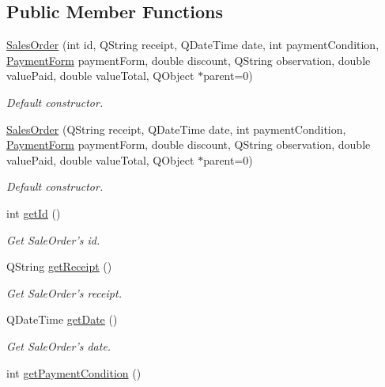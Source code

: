 \subsection*{\-Public \-Member \-Functions}
\begin{DoxyCompactItemize}
\item 
\hyperlink{class_sales_order_a1eed55622ad0394b8859cf809fbfa8ce}{\-Sales\-Order} (int id, \-Q\-String receipt, \-Q\-Date\-Time date, int payment\-Condition, \hyperlink{class_sales_order_aea62d62de9cfe64f734061c664156744}{\-Payment\-Form} payment\-Form, double discount, \-Q\-String observation, double value\-Paid, double value\-Total, \-Q\-Object $\ast$parent=0)
\begin{DoxyCompactList}\small\item\em \-Default constructor. \end{DoxyCompactList}\item 
\hyperlink{class_sales_order_aa95abd1377d1d962535eb401b94b5b08}{\-Sales\-Order} (\-Q\-String receipt, \-Q\-Date\-Time date, int payment\-Condition, \hyperlink{class_sales_order_aea62d62de9cfe64f734061c664156744}{\-Payment\-Form} payment\-Form, double discount, \-Q\-String observation, double value\-Paid, double value\-Total, \-Q\-Object $\ast$parent=0)
\begin{DoxyCompactList}\small\item\em \-Default constructor. \end{DoxyCompactList}\item 
int \hyperlink{class_sales_order_a5fed272542f7afd85f5965aadbece7af}{get\-Id} ()
\begin{DoxyCompactList}\small\item\em \-Get \-Sale\-Order's id. \end{DoxyCompactList}\item 
\-Q\-String \hyperlink{class_sales_order_ab6eb90c054023558dddb040337cf758a}{get\-Receipt} ()
\begin{DoxyCompactList}\small\item\em \-Get \-Sale\-Order's receipt. \end{DoxyCompactList}\item 
\-Q\-Date\-Time \hyperlink{class_sales_order_ad2e646e4df571a5ce5cf3b2dfe33d839}{get\-Date} ()
\begin{DoxyCompactList}\small\item\em \-Get \-Sale\-Order's date. \end{DoxyCompactList}\item 
int \hyperlink{class_sales_order_aca88f3fc93ddb8e27a6e3acddfce8f6f}{get\-Payment\-Condition} ()

\end{DoxyCompactItemize}
